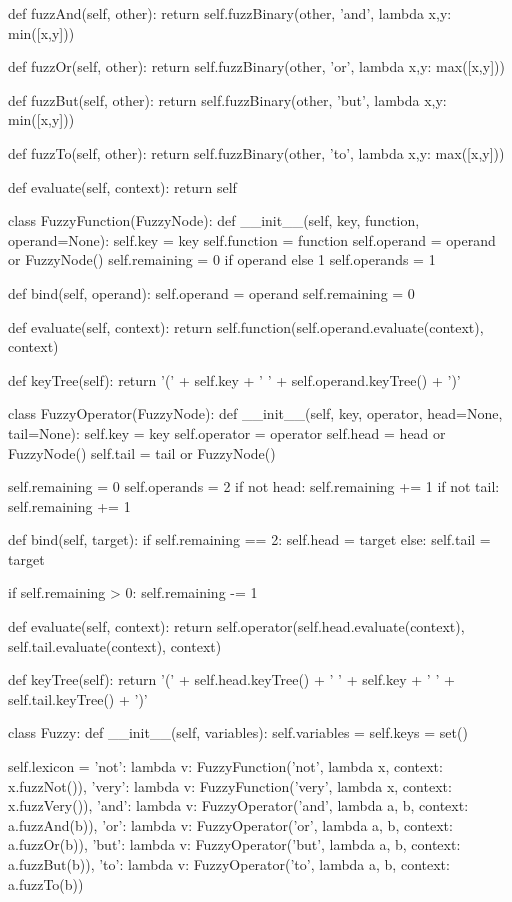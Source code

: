 \documentclass[12pt]{article}
\begin{document}
\begin{python}[]
  def fuzzAnd(self, other):
    return self.fuzzBinary(other, 'and', lambda x,y: min([x,y]))

  def fuzzOr(self, other):
    return self.fuzzBinary(other, 'or', lambda x,y: max([x,y]))

  def fuzzBut(self, other):
    return self.fuzzBinary(other, 'but', lambda x,y: min([x,y]))

  def fuzzTo(self, other):
    return self.fuzzBinary(other, 'to', lambda x,y: max([x,y]))

  def evaluate(self, context):
    return self

class FuzzyFunction(FuzzyNode):
  def __init__(self, key, function, operand=None):
    self.key = key
    self.function = function
    self.operand = operand or FuzzyNode()
    self.remaining = 0 if operand else 1
    self.operands = 1

  def bind(self, operand):
    self.operand = operand
    self.remaining = 0

  def evaluate(self, context):
    return self.function(self.operand.evaluate(context), context)

  def keyTree(self):
    return '(' + self.key + ' ' + self.operand.keyTree() + ')'

class FuzzyOperator(FuzzyNode):
  def __init__(self, key, operator, head=None, tail=None):
    self.key = key
    self.operator = operator
    self.head = head or FuzzyNode()
    self.tail = tail or FuzzyNode()

    self.remaining = 0
    self.operands = 2
    if not head: self.remaining += 1
    if not tail: self.remaining += 1
    
  def bind(self, target):
    if self.remaining == 2:
      self.head = target
    else:
      self.tail = target

    if self.remaining > 0: 
      self.remaining -= 1

  def evaluate(self, context):
    return self.operator(self.head.evaluate(context),
                         self.tail.evaluate(context), 
                         context)

  def keyTree(self):
    return '(' + self.head.keyTree() 
         + ' ' + self.key + ' ' 
         + self.tail.keyTree() + ')'

class Fuzzy:
  def __init__(self, variables):
    self.variables = {}
    self.keys = set()

    self.lexicon = {
      'not': lambda v: FuzzyFunction('not', lambda x, context: x.fuzzNot()),
      'very': lambda v: FuzzyFunction('very', lambda x, context: x.fuzzVery()),
      'and': lambda v: FuzzyOperator('and', lambda a, b, context: a.fuzzAnd(b)),
      'or': lambda v: FuzzyOperator('or', lambda a, b, context: a.fuzzOr(b)),
      'but': lambda v: FuzzyOperator('but', lambda a, b, context: a.fuzzBut(b)),
      'to': lambda v: FuzzyOperator('to', lambda a, b, context: a.fuzzTo(b))
    }


\end{python}
\end{document}
